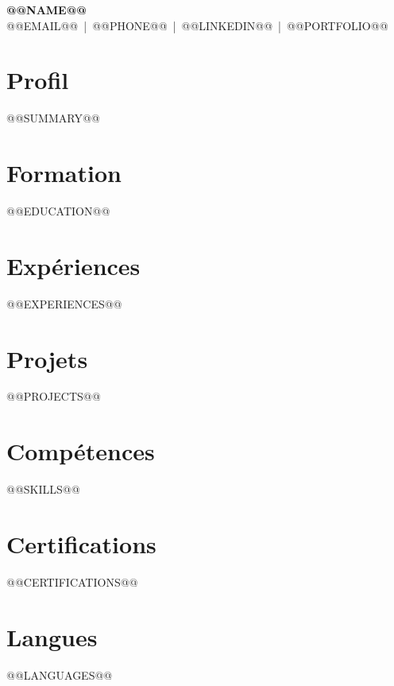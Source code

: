 \documentclass[10pt,a4paper]{article}
\begin{document}
\begin{center}
{\LARGE \textbf{@@NAME@@}}\\[3pt]
@@EMAIL@@ \,|\, @@PHONE@@ \,|\, @@LINKEDIN@@ \,|\, @@PORTFOLIO@@
\end{center}

\section{Profil}
@@SUMMARY@@

\section{Formation}
@@EDUCATION@@

\section{Expériences}
@@EXPERIENCES@@

\section{Projets}
@@PROJECTS@@

\section{Compétences}
@@SKILLS@@

\section{Certifications}
@@CERTIFICATIONS@@

\section{Langues}
@@LANGUAGES@@
\end{document}

